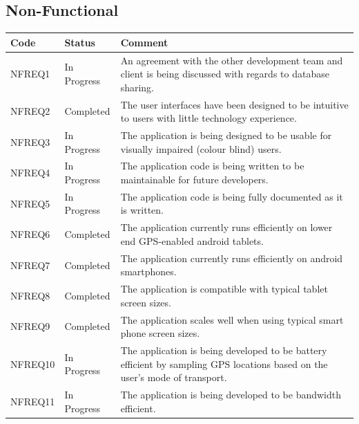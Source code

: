 \documentclass[11pt,a4paper]{article}
\begin{document}
\subsection{Non-Functional}
\label{sec:non-func-reqs}

\begin{longtable}{ p{}|p{}|p{} }
\textbf{Code} & \textbf{Status} & \textbf{Comment} \\

\hline
NFREQ1 & In Progress & An agreement with the other development team and client is being discussed with regards to database sharing. \\ \hline
NFREQ2 & Completed & The user interfaces have been designed to be intuitive to users with little technology experience. \\ \hline
NFREQ3 & In Progress & The application is being designed to be usable for visually impaired (colour blind) users. \\ \hline
NFREQ4 & In Progress & The application code is being written to be maintainable for future developers. \\ \hline
NFREQ5 & In Progress & The application code is being fully documented as it is written. \\ \hline
NFREQ6 & Completed & The application currently runs efficiently on lower end GPS-enabled android tablets. \\ \hline
NFREQ7 & Completed & The application currently runs efficiently on android smartphones. \\ \hline
NFREQ8 & Completed & The application is compatible with typical tablet screen sizes. \\ \hline
NFREQ9 & Completed & The application scales well when using typical smart phone screen sizes. \\ \hline
NFREQ10 & In Progress & The application is being developed to be battery efficient by sampling GPS locations based on the user's mode of transport. \\ \hline
NFREQ11 & In Progress & The application is being developed to be bandwidth efficient. \\ \hline
\end{longtable}

\end{document}
